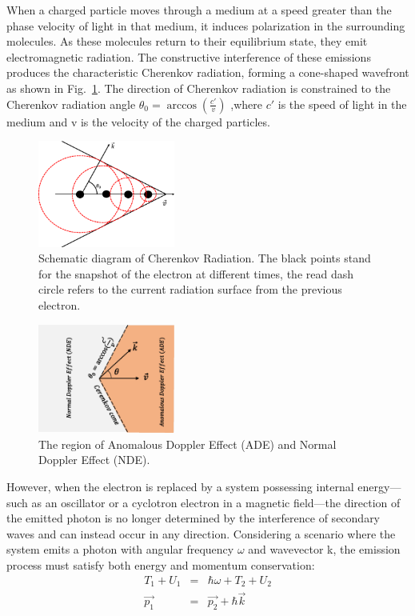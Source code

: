 \documentclass{cpbtex3}
\begin{document}
When a charged particle moves through a medium at a speed greater than the phase velocity of light in that medium, it induces polarization in the surrounding molecules. As these molecules return to their equilibrium state, they emit electromagnetic radiation. The constructive interference of these emissions produces the characteristic Cherenkov radiation, forming a cone-shaped wavefront as shown in Fig.~\ref{fig:cherenkov}. The direction of Cherenkov radiation is constrained to the Cherenkov radiation angle $\theta_0 = \arccos\left(\frac{c'}{v}\right)$
,where $ c'$ is the speed of light in the medium and v is the velocity of the charged particles.
\begin{figure}[ht]
\centering
\includegraphics[width=0.4\textwidth]{Figure1.eps}%
\caption{\label{fig:cherenkov}Schematic diagram of Cherenkov Radiation. The black points stand for the snapshot of the electron at different times, the read dash circle refers to the current radiation surface from the previous electron.}
\end{figure}
\begin{figure}
\centering
\includegraphics[width=0.4\textwidth]{Figure2.eps}%
\caption{\label{fig:ADENDE}The region of Anomalous Doppler Effect (ADE) and Normal Doppler Effect (NDE).}
\end{figure}

However, when the electron is replaced by a system possessing internal energy---such as an oscillator or a cyclotron electron in a magnetic field---the direction of the emitted photon is no longer determined by the interference of secondary waves and can instead occur in any direction. Considering a scenario where the system emits a photon with angular frequency $\omega$ and wavevector k, the emission process must satisfy both energy and momentum conservation:
\begin{subequations}
\begin{eqnarray}
T_1+U_1&=&\hbar \omega +T_2+U_2  \label{Tc} \\  
 \vec{p_1}&=&\vec{p_2}+\hbar\vec{k}   \label{Pc}
\end{eqnarray}
\end{subequations}
\end{document}

